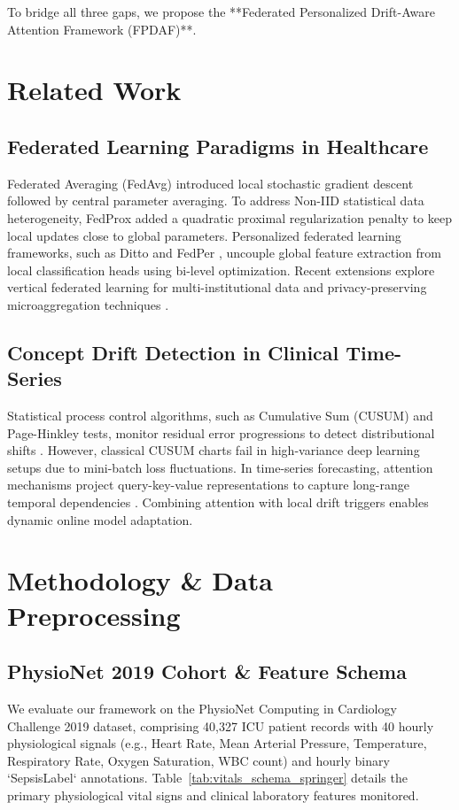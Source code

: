 \documentclass[11pt,a4paper]{article}
\begin{document}
To bridge all three gaps, we propose the **Federated Personalized Drift-Aware Attention Framework (FPDAF)**.

\section{Related Work}
\subsection{Federated Learning Paradigms in Healthcare}
Federated Averaging (FedAvg) \cite{mcmahan2017} introduced local stochastic gradient descent followed by central parameter averaging. To address Non-IID statistical data heterogeneity, FedProx \cite{li2020fedprox} added a quadratic proximal regularization penalty to keep local updates close to global parameters. Personalized federated learning frameworks, such as Ditto \cite{li2021ditto} and FedPer \cite{arivazhagan2020}, uncouple global feature extraction from local classification heads using bi-level optimization. Recent extensions explore vertical federated learning for multi-institutional data \cite{yang2025mvfl} and privacy-preserving microaggregation techniques \cite{gupta2025privacy, maurya2025secure}.

\subsection{Concept Drift Detection in Clinical Time-Series}
Statistical process control algorithms, such as Cumulative Sum (CUSUM) and Page-Hinkley tests, monitor residual error progressions to detect distributional shifts \cite{jothimurugesan2022}. However, classical CUSUM charts fail in high-variance deep learning setups due to mini-batch loss fluctuations. In time-series forecasting, attention mechanisms project query-key-value representations to capture long-range temporal dependencies \cite{larocca2021attention, tang2025horizon}. Combining attention with local drift triggers enables dynamic online model adaptation.

\section{Methodology \& Data Preprocessing}
\subsection{PhysioNet 2019 Cohort \& Feature Schema}
We evaluate our framework on the PhysioNet Computing in Cardiology Challenge 2019 dataset, comprising 40,327 ICU patient records with 40 hourly physiological signals (e.g., Heart Rate, Mean Arterial Pressure, Temperature, Respiratory Rate, Oxygen Saturation, WBC count) and hourly binary `SepsisLabel` annotations. Table~\ref{tab:vitals_schema_springer} details the primary physiological vital signs and clinical laboratory features monitored.
\end{document}
